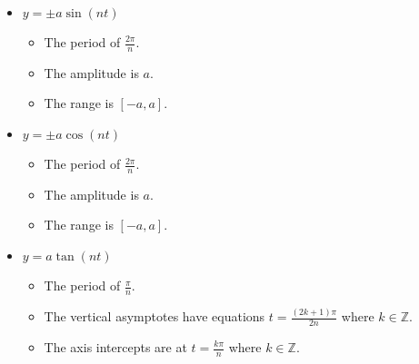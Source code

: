 \documentclass[12pt,a4paper,titlepage]{article}
\begin{document}
            \begin{SummaryBox}[title=Properties of trigonometric functions]
                \begin{itemize}[leftmargin=*]
                    \item $y = \pm a\sin(nt)$
                    \begin{itemize}[topsep=0pt]
                        \item The period of $\frac{2\pi}{n}$.
                        \item The amplitude is $a$.
                        \item The range is $[-a,a]$.
                    \end{itemize}
                    \item $y = \pm a\cos(nt)$
                    \begin{itemize}[topsep=0pt]
                        \item The period of $\frac{2\pi}{n}$.
                        \item The amplitude is $a$.
                        \item The range is $[-a,a]$.
                    \end{itemize}
                    \item $y = a\tan(nt)$
                    \begin{itemize}[topsep=0pt]
                        \item The period of $\frac{\pi}{n}$.
                        \item The vertical asymptotes have equations $t = \frac{(2k + 1)\pi}{2n}$ where $k \in \mathbb{Z}$.
                        \item The axis intercepts are at $t = \frac{k\pi}{n}$ where $k \in \mathbb{Z}$.
                    \end{itemize}
                \end{itemize}
            \end{SummaryBox}
            
\end{document}
